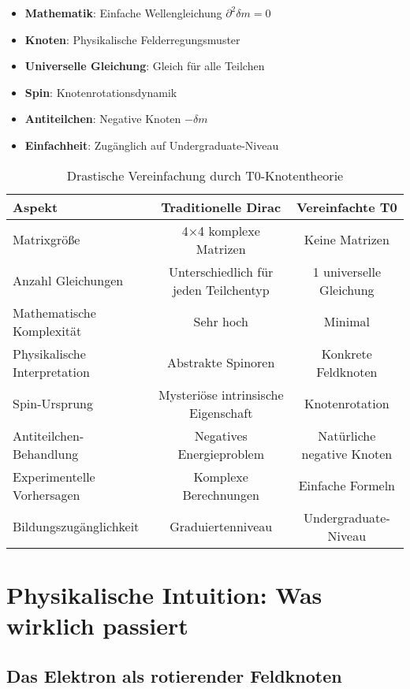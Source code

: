 \documentclass[12pt,a4paper]{article}
\newcommand{\deltam}{\delta m}
\theoremstyle{definition}
\theoremstyle{remark}
\begin{document}
	\begin{itemize}
		\item \textbf{Mathematik}: Einfache Wellengleichung $\partial^2 \deltam = 0$
		\item \textbf{Knoten}: Physikalische Felderregungsmuster
		\item \textbf{Universelle Gleichung}: Gleich für alle Teilchen
		\item \textbf{Spin}: Knotenrotationsdynamik
		\item \textbf{Antiteilchen}: Negative Knoten $-\deltam$
		\item \textbf{Einfachheit}: Zugänglich auf Undergraduate-Niveau
	\end{itemize}
	
	\begin{table}[htbp]
		\centering
		\begin{tabular}{lcc}
			\toprule
			\textbf{Aspekt} & \textbf{Traditionelle Dirac} & \textbf{Vereinfachte T0} \\
			\midrule
			Matrixgröße & 4×4 komplexe Matrizen & Keine Matrizen \\
			Anzahl Gleichungen & Unterschiedlich für jeden Teilchentyp & 1 universelle Gleichung \\
			Mathematische Komplexität & Sehr hoch & Minimal \\
			Physikalische Interpretation & Abstrakte Spinoren & Konkrete Feldknoten \\
			Spin-Ursprung & Mysteriöse intrinsische Eigenschaft & Knotenrotation \\
			Antiteilchen-Behandlung & Negatives Energieproblem & Natürliche negative Knoten \\
			Experimentelle Vorhersagen & Komplexe Berechnungen & Einfache Formeln \\
			Bildungszugänglichkeit & Graduiertenniveau & Undergraduate-Niveau \\
			\bottomrule
		\end{tabular}
		\caption{Drastische Vereinfachung durch T0-Knotentheorie}
		\label{tab:dirac_comparison}
	\end{table}
	
	\section{Physikalische Intuition: Was wirklich passiert}
	
	\subsection{Das Elektron als rotierender Feldknoten}
	
\end{document}
